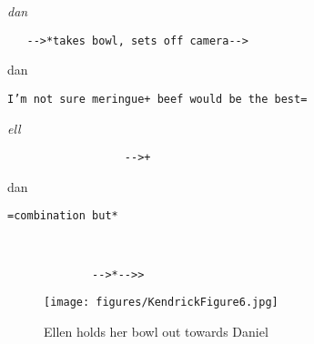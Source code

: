 \documentclass[output=paper,nonflat,modfont,draft]{langsci/langscibook}
\begin{document}
\begin{transbox}{11}{\textit{dan}}
\begin{verbatim}
   -->*takes bowl, sets off camera-->
\end{verbatim}
\end{transbox}


\begin{transbox}{13}{dan}
\begin{verbatim}
I’m not sure meringue+ beef would be the best=
\end{verbatim}
\end{transbox}

\begin{transbox}{14}{\textit{ell}}
\begin{verbatim}
                  -->+
\end{verbatim}
\end{transbox}

\begin{transbox}{15}{dan}
\begin{verbatim}
=combination but*
\end{verbatim}
\end{transbox}

\begin{transbox}{16}{~}
\begin{verbatim}
             -->*-->>
\end{verbatim}
\end{transbox}\bigskip

\begin{figure}
\caption{Ellen holds her bowl out towards Daniel}
\texttt{[image: figures/KendrickFigure6.jpg]}
\label{fig:kendrick:6}
\end{figure}
\end{document}

